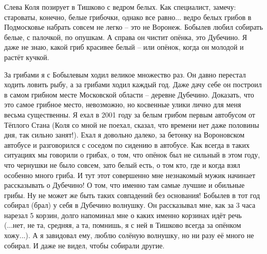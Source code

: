  	     Слева Коля позирует в Тишково с ведром белых. Как специалист, замечу: староваты, конечно, белые грибочки, однако все равно... ведро белых грибов в Подмосковье набрать совсем не легко – это не Воронеж. Бобылев любил собирать белые, с палочкой, по опушкам. А справа он чистит опёнка, это Дубечино. Я даже не знаю, какой гриб красивее белый – или опёнок, когда он молодой и растёт кучкой.

За грибами я с Бобылевым ходил великое множество раз. Он давно перестал ходить ловить рыбу, а за грибами ходил каждый год. Даже дачу себе он построил в самом грибном месте Московской области – деревне Дубечино. Доказать, что это самое грибное место, невозможно, но косвенные улики лично для меня весьма существенны. Я ехал в 2001 году за белым грибом первым автобусом от Тёплого Стана (Коля со мной не поехал, сказал, что времени нет даже половины дня, так сильно занят!). Ехал я довольно далеко, за бетонку на Вороновском автобусе и разговорился с соседом по сидению в автобусе. Как всегда в таких ситуациях мы говорили о грибах, о том, что опёнок был не сильный в этом году, что чернушки не было совсем, зато белый есть, о том кто, где и когда взял особенно много гриба. И тут этот совершенно мне незнакомый мужик начинает рассказывать о Дубечино! О том, что именно там самые лучшие и обильные грибы. Ну не может же быть таких совпадений без основания! Бобылев в тот год собирал (брал) у себя в Дубечино волнушку. Он рассказывал мне, как за 3 часа нарезал 5 корзин, долго напоминал мне о каких именно корзинах идёт речь (...нет, не та, средняя, а та, помнишь, я с ней в Тишково всегда за опёнком хожу...). А я завидовал ему, люблю солёную волнушку, но ни разу её много не собирал. И даже не видел, чтобы собирали другие.


